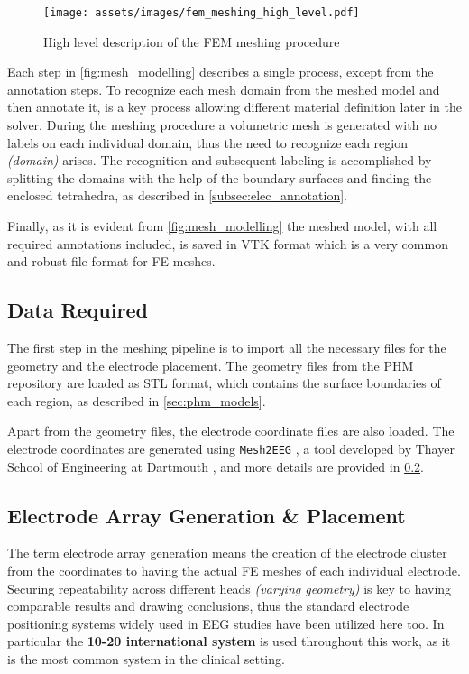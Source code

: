 \begin{figure}[H]
    \centering
    \texttt{[image: assets/images/fem\_meshing\_high\_level.pdf]}
    \caption{High level description of the \gls{FEM} meshing procedure}
    \label{fig:mesh_modelling}
\end{figure}

\noindent Each step in \autoref{fig:mesh_modelling} describes a single process, except from the annotation steps. To recognize each mesh domain from the meshed model and then annotate it, is a key process allowing different material definition later in the solver. During the meshing procedure a volumetric mesh is generated with no labels on each individual domain, thus the need to recognize each region \textit{(domain)} arises. The recognition and subsequent labeling is accomplished by splitting the domains with the help of the boundary surfaces and finding the enclosed tetrahedra, as described in \ref{subsec:elec_annotation}.

Finally, as it is evident from \autoref{fig:mesh_modelling} the meshed model, with all required annotations included, is saved in \gls{VTK} format which is a very common and robust file format for \gls{FE} meshes.

\subsection{Data Required}

The first step in the meshing pipeline is to import all the necessary files for the geometry and the electrode placement. The geometry files from the \gls{PHM} repository \cite{ErikG.Lee2016} are loaded as \gls{STL} format, which contains the surface boundaries of each region, as described in \ref{sec:phm_models}.

Apart from the geometry files, the electrode coordinate files are also loaded. The electrode coordinates are generated using \texttt{Mesh2EEG} \cite{Giacometti2014}, a tool developed by Thayer School of Engineering at Dartmouth \cite{mesh2eeg_web}, and more details are provided in \ref{subsec:elec_placement}.

\subsection{Electrode Array Generation \& Placement}
\label{subsec:elec_placement}

The term electrode array generation means the creation of the electrode cluster from the coordinates to having the actual \gls{FE} meshes of each individual electrode. Securing repeatability across different heads \textit{(varying geometry)} is key to having comparable results and drawing conclusions, thus the standard electrode positioning systems widely used in \gls{EEG} studies have been utilized here too. In particular the \textbf{10-20 international system} \cite[chapter 13]{Malmivuo1995} is used throughout this work, as it is the most common system in the clinical setting. 


